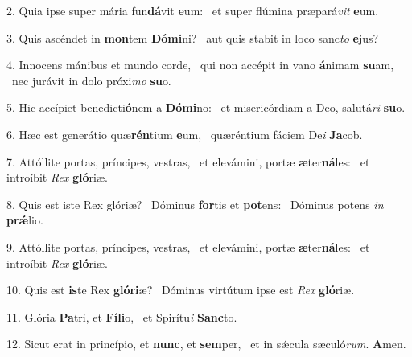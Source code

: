 2. Quia ipse super mária fun\textbf{dá}vit \textbf{e}um: \ast\  et super flúmina præpará\textit{vit} \textbf{e}um.\

3. Quis ascéndet in \textbf{mon}tem \textbf{Dó}\textbf{mi}ni? \ast\  aut quis stabit in loco sanc\textit{to} \textbf{e}jus?\

4. Innocens mánibus et mundo corde, \dag\  qui non accépit in vano \textbf{á}nimam \textbf{su}am, \ast\  nec jurávit in dolo próxi\textit{mo} \textbf{su}o.\

5. Hic accípiet benedicti\textbf{ó}nem a \textbf{Dó}\textbf{mi}no: \ast\  et misericórdiam a Deo, salutá\textit{ri} \textbf{su}o.\

6. Hæc est generátio quæ\textbf{rén}tium \textbf{e}um, \ast\  quæréntium fáciem De\textit{i} \textbf{Ja}cob.\

7. Attóllite portas, príncipes, vestras, \dag\  et elevámini, portæ \textbf{æ}ter\textbf{ná}les: \ast\  et introíbit \textit{Rex} \textbf{gló}riæ.\

8. Quis est iste Rex glóriæ? \dag\  Dóminus \textbf{for}tis et \textbf{pot}ens: \ast\  Dóminus potens \textit{in} \textbf{prǽ}lio.\

9. Attóllite portas, príncipes, vestras, \dag\  et elevámini, portæ \textbf{æ}ter\textbf{ná}les: \ast\  et introíbit \textit{Rex} \textbf{gló}riæ.\

10. Quis est \textbf{is}te Rex \textbf{gló}\textbf{ri}æ? \ast\  Dóminus virtútum ipse est \textit{Rex} \textbf{gló}riæ.\

11. Glória \textbf{Pa}tri, et \textbf{Fí}\textbf{li}o, \ast\  et Spirítu\textit{i} \textbf{Sanc}to.\

12. Sicut erat in princípio, et \textbf{nunc}, et \textbf{sem}per, \ast\  et in sǽcula sæculó\textit{rum}. \textbf{A}men.\

